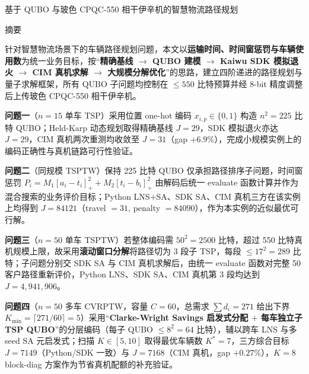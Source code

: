 \documentclass[UTF8,12pt,a4paper]{ctexart}
\begin{document}
\begin{center}
{\selectfont
基于 QUBO 与玻色 CPQC-550 相干伊辛机的智慧物流路径规划}
\end{center}
\vspace{0.6em}

\begin{center}
{\selectfont 摘\quad 要}
\end{center}
\vspace{0.4em}

针对智慧物流场景下的车辆路径规划问题，本文以\textbf{运输时间、时间窗惩罚与车辆使用数}为统一业务目标，按``\textbf{精确基线 $\rightarrow$ QUBO 建模 $\rightarrow$ Kaiwu SDK 模拟退火 $\rightarrow$ CIM 真机求解 $\rightarrow$ 大规模分解优化}''的思路，建立四阶递进的路径规划与量子求解框架，所有 QUBO 子问题均控制在 $\le 550$ 比特预算并经 8-bit 精度调整后上传玻色 CPQC-550 相干伊辛机。

\textbf{问题一}（$n=15$ 单车 TSP）采用位置 one-hot 编码 $x_{i,p}\!\in\!\{0,1\}$ 构造 $n^{2}=225$ 比特 QUBO；Held-Karp 动态规划取得精确基线 $J=29$，SDK 模拟退火亦达 $J=29$，CIM 真机两次重测均收敛至 $J=31$（gap $+6.9\%$），完成小规模实例上的编码正确性与真机链路可行性验证。

\textbf{问题二}（同规模 TSPTW）保持 225 比特 QUBO 仅承担路径排序子问题，时间窗惩罚 $P_i=M_1[a_i\!-\!t_i]_+^2+M_2[t_i\!-\!b_i]_+^2$ 由解码后统一 evaluate 函数计算并作为混合搜索的业务评价目标；Python LNS$+$SA、SDK SA、CIM 真机三方在该实例上均得到 $J=84121$（travel $=31$, penalty $=84090$），作为本实例的近似最优可行解。

\textbf{问题三}（$n=50$ 单车 TSPTW）若整体编码需 $50^{2}=2500$ 比特，超过 550 比特真机规模上限，故采用\textbf{滚动窗口分解}将路径切为 3 段子 TSP，每段 $\le 17^{2}=289$ 比特；子问题分别交 SDK SA 与 CIM 真机求解后，由统一 evaluate 函数对完整 50 客户路径重新评价，Python LNS、SDK SA、CIM 真机第 3 段均达到 $J=4{,}941{,}906$。

\textbf{问题四}（$n=50$ 多车 CVRPTW，容量 $C=60$，总需求 $\sum d_i=271$ 给出下界 $K_{\min}=\lceil 271/60\rceil=5$）采用``\textbf{Clarke-Wright Savings 启发式分配 $+$ 每车独立子 TSP QUBO}''的分层编码（每子 QUBO $\le 8^{2}=64$ 比特），辅以跨车 LNS 与多 seed SA 元启发式；扫描 $K\!\in\![5,10]$ 取得最优车辆数 $K^{*}=7$，三方综合目标 $J=7149$（Python/SDK 一致）与 $J=7168$（CIM 真机，gap $+0.27\%$），$K=8$ block-diag 方案作为节省真机配额的补充验证。
\end{document}
